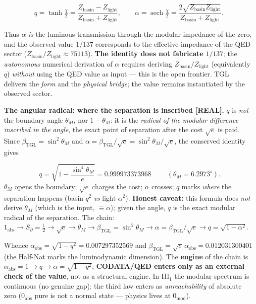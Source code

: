 \documentclass[11pt]{article}
\newcommand{\bTGL}{\beta_{\mathrm{TGL}}}\newcommand{\Msun}{M_{\odot}}\newcommand{\TGL}{\mathrm{TGL}}
\theoremstyle{definition}\newtheorem{deriv}{Derivation}
\begin{document}
\begin{equation}q=\tanh\tfrac\chi2=\frac{Z_{\mathrm{basin}}-Z_{\mathrm{light}}}{Z_{\mathrm{basin}}+Z_{\mathrm{light}}},\qquad \alpha=\operatorname{sech}\tfrac\chi2=\frac{2\sqrt{Z_{\mathrm{basin}}Z_{\mathrm{light}}}}{Z_{\mathrm{basin}}+Z_{\mathrm{light}}}.\end{equation}

Thus $\alpha$ \emph{is} the luminous transmission through the modular impedance of the zero, and the observed value $1/137$ corresponds to the effective impedance of the QED sector ($Z_{\mathrm{basin}}/Z_{\mathrm{light}}\approx75113$). \textbf{The identity does not fabricate $1/137$}; the \emph{autonomous} numerical derivation of $\alpha$ requires deriving $Z_{\mathrm{basin}}/Z_{\mathrm{light}}$ (equivalently $q$) \emph{without} using the QED value as input --- this is the open frontier. TGL delivers the \emph{form} and the \emph{physical bridge}; the value remains instantiated by the observed sector.

\textbf{The angular radical: where the separation is inscribed \textsf{[REAL]}.} $q$ is \emph{not} the boundary angle $\theta_M$, nor $1-\theta_M$: it is the \emph{radical of the modular difference inscribed in the angle}, the exact point of separation after the cost $\sqrt e$ is paid. Since $\bTGL=\sin^2\theta_M$ and $\alpha=\bTGL/\sqrt e=\sin^2\theta_M/\sqrt e$, the conserved identity gives

\begin{equation}\boxed{\;q=\sqrt{1-\frac{\sin^4\theta_M}{e}}=0.999973373968\;}\qquad(\theta_M=6.2973^\circ).\end{equation}\noindent $\theta_M$ opens the boundary; $\sqrt e$ charges the cost; $\alpha$ crosses; $q$ marks \emph{where} the separation happens (basin $q^2$ \emph{vs} light $\alpha^2$). \textbf{Honest caveat:} this formula does \emph{not} derive $\theta_M$ (which is the input, $\equiv\alpha$); given the angle, $q$ is the exact modular radical of the separation. The chain: $1_{\mathrm{abs}}\to S_\partial=\tfrac12\to\sqrt e\to\theta_M\to\bTGL=\sin^2\theta_M\to\alpha=\bTGL/\sqrt e\to q=\sqrt{1-\alpha^2}$.

Whence $\alpha_{\mathrm{obs}}=\sqrt{1-q^2}=0.007297352569$ and $\bTGL=\sqrt e\,\alpha_{\mathrm{obs}}=0.012031300401$ (the Half-Nat marks the luminodynamic dimension). The \textbf{engine} of the chain is $\alpha_{\mathrm{abs}}=1\to q\to\alpha=\sqrt{1-q^2}$; \textbf{CODATA/QED enters only as an external check of the value}, not as a structural engine. In \mbox{III$_1$} the modular spectrum is continuous (no genuine gap); the third law enters as \emph{unreachability} of absolute zero ($0_{\mathrm{abs}}$ pure is not a normal state --- physics lives at $0_{\mathrm{mod}}$).
\end{document}
